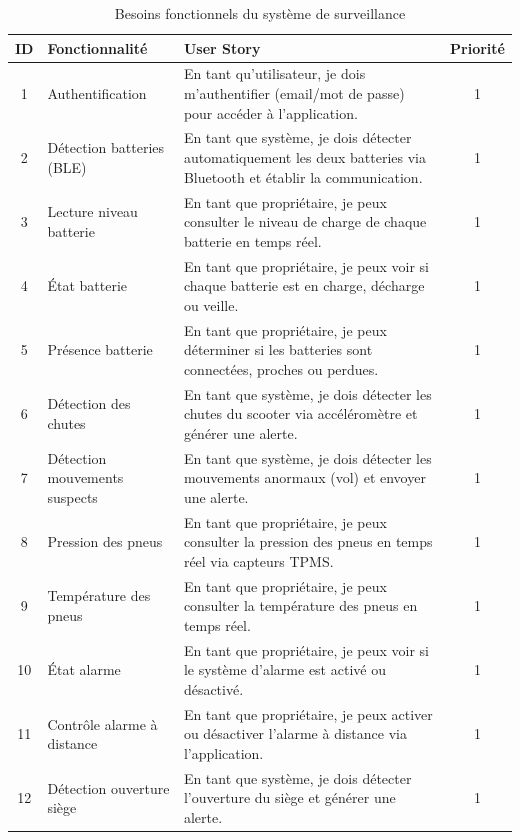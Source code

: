\documentclass[12pt, a4paper]{report}
\begin{document}
\begin{table}[H]
  \centering
  \caption{Besoins fonctionnels du système de surveillance}
  \label{tab:fonctionnels}
  \renewcommand{\arraystretch}{1.3}
  \small
  \begin{tabularx}{\textwidth}{|c|p{3cm}|X|c|}
    \hline
    \rowcolor{isimablue!20}
    \textbf{ID} & \textbf{Fonctionnalité} & \textbf{User Story} & \textbf{Priorité} \\
    \hline
    1  & Authentification & En tant qu'utilisateur, je dois m'authentifier (email/mot de passe) pour accéder à l'application. & 1 \\
    \hline
    2  & Détection batteries (BLE) & En tant que système, je dois détecter automatiquement les deux batteries via Bluetooth et établir la communication. & 1 \\
    \hline
    3  & Lecture niveau batterie & En tant que propriétaire, je peux consulter le niveau de charge de chaque batterie en temps réel. & 1 \\
    \hline
    4  & État batterie & En tant que propriétaire, je peux voir si chaque batterie est en charge, décharge ou veille. & 1 \\
    \hline
    5  & Présence batterie & En tant que propriétaire, je peux déterminer si les batteries sont connectées, proches ou perdues. & 1 \\
    \hline
    6  & Détection des chutes & En tant que système, je dois détecter les chutes du scooter via accéléromètre et générer une alerte. & 1 \\
    \hline
    7  & Détection mouvements suspects & En tant que système, je dois détecter les mouvements anormaux (vol) et envoyer une alerte. & 1 \\
    \hline
    8  & Pression des pneus & En tant que propriétaire, je peux consulter la pression des pneus en temps réel via capteurs TPMS. & 1 \\
    \hline
    9  & Température des pneus & En tant que propriétaire, je peux consulter la température des pneus en temps réel. & 1 \\
    \hline
    10 & État alarme & En tant que propriétaire, je peux voir si le système d'alarme est activé ou désactivé. & 1 \\
    \hline
    11 & Contrôle alarme à distance & En tant que propriétaire, je peux activer ou désactiver l'alarme à distance via l'application. & 1 \\
    \hline
    12 & Détection ouverture siège & En tant que système, je dois détecter l'ouverture du siège et générer une alerte. & 1 \\

\end{tabularx}
\end{table}
\end{document}
